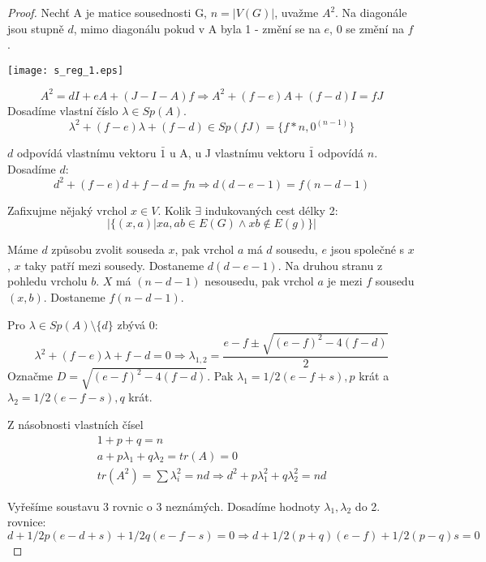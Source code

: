 \begin{proof}
	Nechť A je matice sousednosti G, $n = |V(G)|$, uvažme $A^2$.
	Na diagonále jsou stupně $d$, mimo diagonálu pokud v A byla 1 - změní se na $e$, 0 se změní na $f$.

	\texttt{[image: s\_reg\_1.eps]}

	\[ A^2 = dI + eA + (J -I - A)f \Rightarrow A^2 + (f - e)A + (f - d)I = fJ \]
	Dosadíme vlastní číslo $\lambda \in Sp(A)$.
	\[ \lambda^2 + (f - e)\lambda + (f - d) \in Sp(fJ) = \{ f * n, 0^{(n-1)} \} \]

	$d$ odpovídá vlastnímu vektoru $\bar{1}$ u A, u J vlastnímu vektoru $\bar{1}$ odpovídá $n$. Dosadíme $d$:
	\[ d^2 + (f - e)d + f - d = fn \Rightarrow d(d - e - 1) = f(n - d - 1)\]

	Zafixujme nějaký vrchol $x \in V$. Kolik $\exists$ indukovaných cest délky 2:
	\[ |\{ (x,a) | xa, ab \in E(G) \land xb \notin E(g) \}| \]

	Máme $d$ způsobu zvolit souseda $x$, pak vrchol $a$ má $d$ sousedu, $e$ jsou společné s $x$, $x$ taky patří mezi sousedy. Dostaneme $d (d - e - 1)$.
	Na druhou stranu z pohledu vrcholu $b$. $X$ má $(n - d - 1)$ nesousedu, pak vrchol $a$ je mezi $f$ sousedu $(x,b)$. Dostaneme $f(n - d - 1)$.

	Pro $\lambda \in Sp(A)\setminus \{d\}$ zbývá 0:
	\[ \lambda^2 + (f - e)\lambda + f - d = 0 \Rightarrow \lambda_{1,2} = \frac{e - f \pm \sqrt{(e - f)^2 - 4 (f - d)}}{2} \]
	Označme $D = \sqrt{(e - f)^2 - 4 (f - d)}$. Pak $\lambda_1 = 1/2 (e - f + s), p$ krát a $\lambda_2 = 1/2 (e - f - s), q$ krát.

	Z násobnosti vlastních čísel
	\begin{equation*}
	\begin{aligned}
	 1 + p + q = n \\
	 a + p\lambda_1 + q \lambda_2 = tr(A) = 0 \\
	 tr(A^2) = \sum \lambda_i^2 = nd \Rightarrow d^2 + p \lambda_1^2 + q \lambda_2^2 = nd
	\end{aligned}
	\end{equation*}

	Vyřešíme soustavu 3 rovnic o 3 neznámých.
	Dosadíme hodnoty $\lambda_1, \lambda_2$ do 2. rovnice:
	\[ d + 1/2 p (e - d + s) + 1/2 q (e - f - s) = 0 \Rightarrow d + 1/2(p + q) (e - f) + 1/2 (p - q) s = 0 \]


\end{proof}
